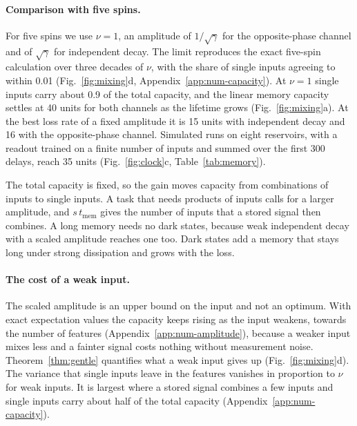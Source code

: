 \paragraph{Comparison with five spins.}
For five spins we use $\nu=1$, an amplitude of $1/\sqrt\gamma$ for the opposite-phase channel and of $\sqrt\gamma$
for independent decay. The limit reproduces the exact five-spin calculation over three decades of $\nu$, with the
share of single inputs agreeing to within 0.01 (Fig.~\ref{fig:mixing}d, Appendix~\ref{app:num-capacity}). At $\nu=1$
single inputs carry about 0.9 of the total capacity, and the linear memory capacity settles at 40 units for both
channels as the lifetime grows (Fig.~\ref{fig:mixing}a). At the best loss rate of a fixed amplitude it is 15 units
with independent decay and 16 with the opposite-phase channel. Simulated runs on eight reservoirs, with a readout
trained on a finite number of inputs and summed over the first 300 delays, reach 35 units (Fig.~\ref{fig:clock}c,
Table~\ref{tab:memory}).

The total capacity is fixed, so the gain moves capacity from combinations of inputs to single inputs. A task that needs products of inputs calls for a larger amplitude, and
$s\,t_{\mathrm{mem}}$ gives the number of inputs that a stored signal then combines. A long memory needs no dark
states, because weak independent decay with a scaled amplitude reaches one too. Dark states add a memory that stays
long under strong dissipation and grows with the loss.

\paragraph{The cost of a weak input.}
The scaled amplitude is an upper bound on the input and not an optimum. With exact expectation values the capacity
keeps rising as the input weakens, towards the number of features (Appendix~\ref{app:num-amplitude}), because a
weaker input mixes less and a fainter signal costs nothing without measurement noise. Theorem~\ref{thm:gentle} quantifies what a weak input gives up
(Fig.~\ref{fig:mixing}d). The variance that single inputs leave in the features vanishes in proportion to $\nu$ for
weak inputs. It is largest where a stored signal combines a few inputs and single inputs carry about half of the
total capacity (Appendix~\ref{app:num-capacity}).

